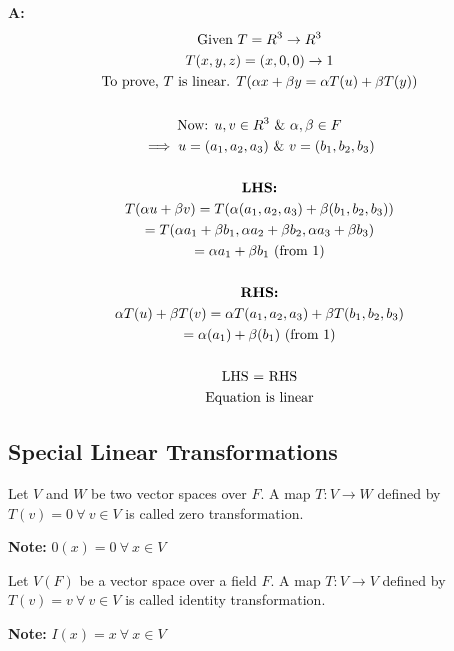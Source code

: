 \documentclass[english,course,fleqn]{lecture}
\newenvironment{qanda}{\setlength{\parindent}{0pt}}{\bigskip}
\newcommand{\A}{\par\textbf{A:} \normalfont}
\begin{document}
\begin{qanda}
	\A
	\begin{gather*}
		\text{Given } T = R^{3} \rightarrow R^{3}\\
		T(x,y,z) = (x,0,0) \rightarrow 1\\
		\text{To prove, $T$ is linear. $T(\alpha x + \beta y = \alpha T(u) + \beta T(y))$}\\
		\\
		\text{Now: } u,v \in R^{3} ~\&~ \alpha, \beta \in F\\
		\implies u = (a_{1}, a_{2}, a_{3}) ~\&~ v = (b_{1}, b_{2}, b_{3})\\
		\\
		\text{\textbf{LHS:}}\\
		T(\alpha u + \beta v) = T(\alpha (a_{1}, a_{2}, a_{3}) + \beta(b_{1}, b_{2}, b_{3}))\\
		= T(\alpha a_{1} + \beta b_{1}, \alpha a_{2} + \beta b_{2}, \alpha a_{3} + \beta b_{3})\\
		= \alpha a_{1} + \beta b_{1} \text{ (from 1)}\\
		\\
		\text{\textbf{RHS:}}\\
		\alpha T(u) + \beta T(v) = \alpha T(a_{1}, a_{2}, a_{3}) + \beta T(b_{1}, b_{2}, b_{3})\\
		= \alpha (a_{1}) + \beta (b_{1}) \text{ (from 1)}\\
		\\
		\text{LHS $=$ RHS}\\
		\text{Equation is linear}
	\end{gather*}
\end{qanda}

\newpage

\subsection{Special Linear Transformations}

\begin{definition}
	Let $V$ and $W$ be two vector spaces over $F$.
	A map $T:V\rightarrow W$ defined by $T(v) = 0 ~\forall~ v \in V$ is called zero transformation.

	\textbf{Note: } $0(x) = 0 ~\forall~ x \in V$
\end{definition}

\begin{definition}
	Let $V(F)$ be a vector space over a field $F$.
	A map $T:V\rightarrow V$ defined by $T(v) = v ~\forall~ v \in V$ is called identity transformation.

	\textbf{Note: }$I(x) = x ~\forall~ x \in V$
\end{definition}
\end{document}
